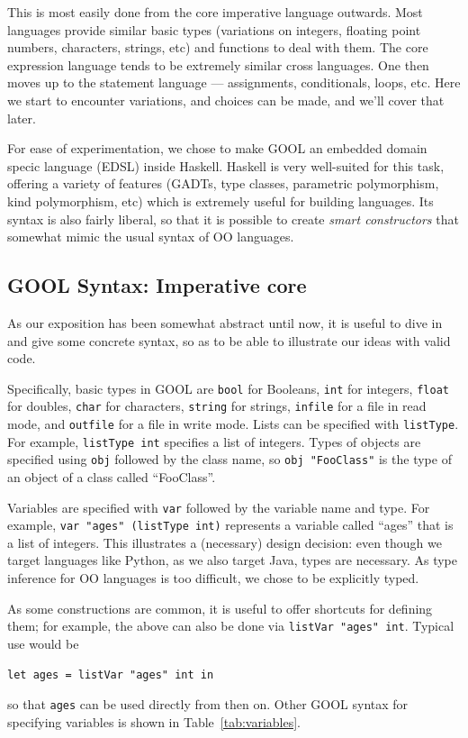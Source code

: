 \documentclass[sigplan,review,anonymous,prologue,dvipsnames]{acmart}
\begin{document}
This is most easily done from the core imperative language outwards.
Most languages provide similar basic types (variations on integers,
floating point numbers, characters, strings, etc) and functions to deal
with them. The core expression language tends to be extremely similar
cross languages. One then moves up to the statement language ---
assignments, conditionals, loops, etc.  Here we start to encounter
variations, and choices can be made, and we'll cover that later.

For ease of experimentation, we chose to make GOOL an embedded
domain specic language (EDSL) inside Haskell.  Haskell is very well-suited
for this task, offering a variety of features (GADTs, type classes,
parametric polymorphism, kind polymorphism, etc) which is extremely useful
for building languages.  Its syntax is also fairly liberal, so that it is
possible to create \emph{smart constructors} that somewhat mimic the
usual syntax of OO languages.

\subsection{GOOL Syntax: Imperative core} \label{ssec:syntax}

As our exposition has been somewhat abstract until now, it is useful to
dive in and give some concrete syntax, so as to be able to illustrate
our ideas with valid code.

Specifically, basic types in GOOL are \verb|bool| for Booleans,
\verb|int| for integers, \verb|float| for doubles, \verb|char|
for characters, \verb|string| for strings, \verb|infile| for a file
in read mode, and \verb|outfile| for a file in write mode. Lists can be
specified with \verb|listType|. For example, \verb|listType int|
specifies a list of integers. Types of objects are specified using
\verb|obj| followed by the class name, so \verb|obj "FooClass"| is the type of
an object of a class called ``FooClass''.

Variables are specified with \verb|var| followed by the variable name and type.
For example, \verb|var "ages" (listType int)| represents a variable called
``ages'' that is a list of integers. This illustrates a (necessary) design
decision: even though we target languages like Python, as we also target
Java, types are necessary. As type inference for OO languages is too
difficult, we chose to be explicitly typed.

As some constructions are common, it is useful to offer shortcuts for
defining them; for example, the above can also be done via
\verb|listVar "ages" int|. Typical use would be
\begin{lstlisting}
let ages = listVar "ages" int in
\end{lstlisting}
so that \verb|ages| can be used directly from then on. Other GOOL syntax for
specifying variables is shown in Table~\ref{tab:variables}.
\end{document}

